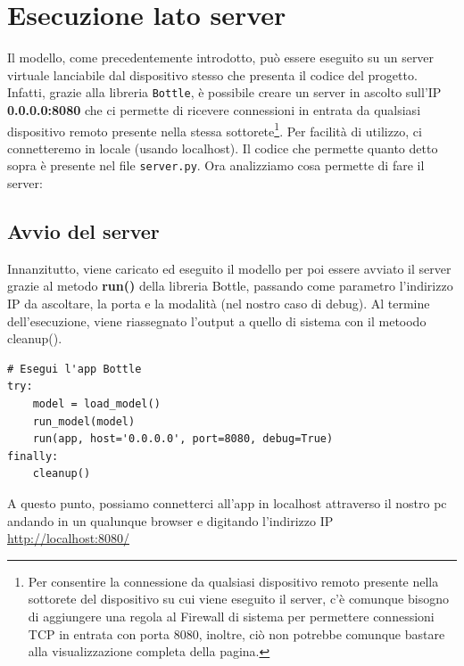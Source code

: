 \documentclass{article}
\begin{document}
\section{Esecuzione lato server}
Il modello, come precedentemente introdotto, può essere eseguito su un server virtuale lanciabile dal dispositivo stesso che presenta il codice del progetto. Infatti, grazie alla libreria \texttt{Bottle}, è possibile creare un server in ascolto sull'IP \textbf{0.0.0.0:8080} che ci permette di ricevere connessioni in entrata da qualsiasi dispositivo remoto presente nella stessa sottorete\footnote{Per consentire la connessione da qualsiasi dispositivo remoto presente nella sottorete del dispositivo su cui viene eseguito il server, c'è comunque bisogno di aggiungere una regola al Firewall di sistema per permettere connessioni TCP in entrata con porta 8080, inoltre, ciò non potrebbe comunque bastare alla visualizzazione completa della pagina.}. Per facilità di utilizzo, ci connetteremo in locale (usando localhost). Il codice che permette quanto detto sopra è presente nel file \texttt{server.py}. Ora analizziamo cosa permette di fare il server:

\subsection{Avvio del server}
Innanzitutto, viene caricato ed eseguito il modello per poi essere avviato il server grazie al metodo \textbf{run()} della libreria Bottle, passando come parametro l'indirizzo IP da ascoltare, la porta e la modalità (nel nostro caso di debug). Al termine dell'esecuzione, viene riassegnato l'output a quello di sistema con il metoodo cleanup().

\begin{verbatim}
# Esegui l'app Bottle
try:
    model = load_model()
    run_model(model)
    run(app, host='0.0.0.0', port=8080, debug=True)
finally:
    cleanup()
\end{verbatim}

A questo punto, possiamo connetterci all'app in localhost attraverso il nostro pc andando in un qualunque browser e digitando l'indirizzo IP \href{http://localhost:8080/}{http://localhost:8080/}
\end{document}
